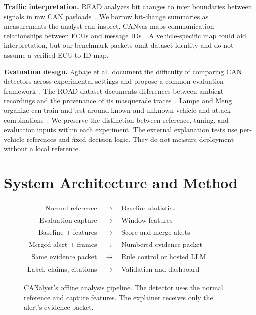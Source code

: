 \documentclass[sigconf,pbalance=true]{acmart}
\begin{document}
\textbf{Traffic interpretation.}
READ analyzes bit changes to infer boundaries between signals in raw CAN payloads~\cite{marchetti2019read}. We borrow bit-change summaries as measurements the analyst can inspect. CANvas maps communication relationships between ECUs and message IDs~\cite{kulandaivel2019canvas}. A vehicle-specific map could aid interpretation, but our benchmark packets omit dataset identity and do not assume a verified ECU-to-ID map.

\textbf{Evaluation design.}
Agbaje et al.\ document the difficulty of comparing CAN detectors across experimental settings and propose a common evaluation framework~\cite{agbaje2022framework}. The ROAD dataset documents differences between ambient recordings and the provenance of its masquerade traces~\cite{verma2024road}. Lampe and Meng organize can-train-and-test around known and unknown vehicle and attack combinations~\cite{lampe2024ctt}. We preserve the distinction between reference, tuning, and evaluation inputs within each experiment. The external explanation tests use per-vehicle references and fixed decision logic. They do not measure deployment without a local reference.

\section{System Architecture and Method}

\begin{figure}[t]
  \centering
  \small
  \setlength{\tabcolsep}{5pt}
  \begin{tabular}{@{}rcl@{}}
  Normal reference & $\rightarrow$ & Baseline statistics \\
  Evaluation capture & $\rightarrow$ & Window features \\
  Baseline + features & $\rightarrow$ & Score and merge alerts \\
  Merged alert + frames & $\rightarrow$ & Numbered evidence packet \\
  Same evidence packet & $\rightarrow$ & Rule control or hosted LLM \\
  Label, claims, citations & $\rightarrow$ & Validation and dashboard
  \end{tabular}
  \caption{CANalyst's offline analysis pipeline. The detector uses the normal reference and capture features. The explainer receives only the alert's evidence packet.}
  \label{fig:pipeline}
\end{figure}
\end{document}
